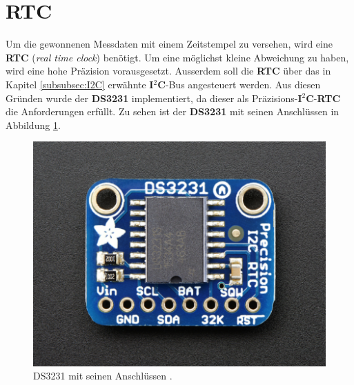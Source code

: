 \section{RTC}
\label{chap:RTC}
Um die gewonnenen Messdaten mit einem Zeitstempel zu versehen, wird eine \textbf{RTC} (\textit{real time clock}) benötigt. Um eine möglichst kleine Abweichung zu haben, wird eine hohe Präzision vorausgesetzt. Ausserdem soll die \textbf{RTC} über das in Kapitel \ref{subsubsec:I2C} erwähnte \textbf{I$^2$C}-Bus angesteuert werden. Aus diesen Gründen wurde der \textbf{DS3231} implementiert, da dieser als Präzisions-\textbf{I$^2$C}-\textbf{RTC} die Anforderungen erfüllt. Zu sehen ist der \textbf{DS3231} mit seinen Anschlüssen in Abbildung \ref{fig:DS3231}.

\begin{figure}[h]
\centering
\includegraphics[width=0.6\linewidth]{graphics/DS3231.png}
\caption{DS3231 mit seinen Anschlüssen \cite{Ada2018}.}
\label{fig:DS3231}
\end{figure}